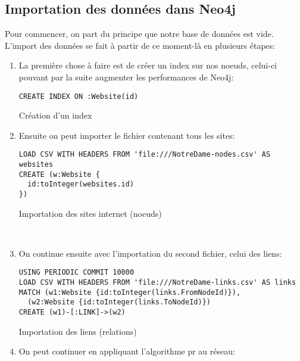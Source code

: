 \documentclass[12pt,twoside, openright]{memoir}
\begin{document}
	\subsection{Importation des données dans Neo4j}
	Pour commencer, on part du principe que notre base de données est vide. L'import des données se fait à partir de ce moment-là en plusieurs étapes:
	\begin{enumerate}
		\item La première chose à faire est de créer un index sur nos noeuds, celui-ci pouvant par la suite augmenter les performances de Neo4j:\vspace{-3pt}
		\begin{listing}
			\begin{verbatim}
CREATE INDEX ON :Website(id)
			\end{verbatim}
			\caption{Création d'un index}
		\end{listing}
		\item Ensuite on peut importer le fichier contenant tous les sites:\vspace{-3pt}
		\begin{listing}
			\begin{verbatim}
LOAD CSV WITH HEADERS FROM 'file:///NotreDame-nodes.csv' AS websites
CREATE (w:Website {
  id:toInteger(websites.id)
})
			\end{verbatim}
			\caption{Importation des sites internet (noeuds)}
		\end{listing}\\
		\item On continue ensuite avec l'importation du second fichier, celui des liens:\vspace{-3pt}
		\begin{listing}[H]
			\begin{verbatim}
USING PERIODIC COMMIT 10000
LOAD CSV WITH HEADERS FROM 'file:///NotreDame-links.csv' AS links
MATCH (w1:Website {id:toInteger(links.FromNodeId)}), 
  (w2:Website {id:toInteger(links.ToNodeId)})
CREATE (w1)-[:LINK]->(w2)
			\end{verbatim}
			\caption{Importation des liens (relations)}
		\end{listing}\newpage
		\item On peut continuer en appliquant l'algorithme \gls{pr} au réseau:\vspace{-3pt}

\end{enumerate}
\end{document}
